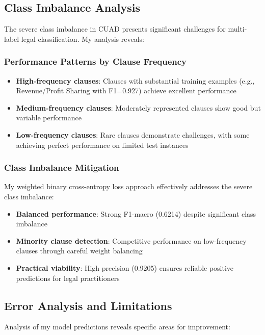 \subsection{Class Imbalance Analysis}
\label{subsec:class_imbalance}

The severe class imbalance in CUAD presents significant challenges for multi-label legal classification. My analysis reveals:

\subsubsection{Performance Patterns by Clause Frequency}
\begin{itemize}
\item \textbf{High-frequency clauses}: Clauses with substantial training examples (e.g., Revenue/Profit Sharing with F1=0.927) achieve excellent performance
\item \textbf{Medium-frequency clauses}: Moderately represented clauses show good but variable performance
\item \textbf{Low-frequency clauses}: Rare clauses demonstrate challenges, with some achieving perfect performance on limited test instances
\end{itemize}

\subsubsection{Class Imbalance Mitigation}
My weighted binary cross-entropy loss approach effectively addresses the severe class imbalance:

\begin{itemize}
\item \textbf{Balanced performance}: Strong F1-macro (0.6214) despite significant class imbalance
\item \textbf{Minority clause detection}: Competitive performance on low-frequency clauses through careful weight balancing
\item \textbf{Practical viability}: High precision (0.9205) ensures reliable positive predictions for legal practitioners
\end{itemize}

\subsection{Error Analysis and Limitations}
\label{subsec:error_analysis}

Analysis of my model predictions reveals specific areas for improvement:

